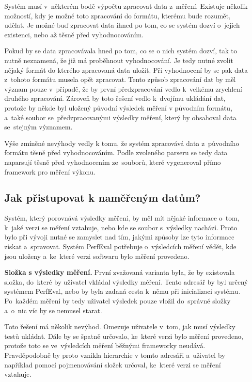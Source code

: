 Systém musí v~některém bodě výpočtu zpracovat data z~měření. Existuje několik možností, kdy
je možné toto zpracování do formátu, kterému bude rozumět, udělat. Je možné buď zpracovat
data ihned po tom, co se systém dozví o~jejich existenci, nebo až těsně před vyhodnocováním.

Pokud by se data zpracovávala hned po tom, co se o nich systém dozví, tak to nutně neznamená,
že již má proběhnout vyhodnocování. Je tedy nutné zvolit nějaký formát do kterého zpracovaná data
uložit. Při vyhodnocení by se pak data z~tohoto formátu musela opět zpracovat. Tento způsob
zpracování dat by měl význam pouze v~případě, že by první předzpracování vedlo k~velkému
zrychlení druhého zpracování. Zároveň by toto řešení vedlo k~dvojímu ukládání dat, protože
by někde byl uložený původní výsledek měření v původním formátu, a~také soubor se~předzpracovanými
výsledky měření, který by obsahoval data se~stejným významem.

Výše zmíněné nevýhody vedly k tomu, že systém zpracovává data z~původního formátu těsně před
vyhodnocováním. Podle zvoleného parseru se tedy data naparsují těsně před vyhodnocením ze~souborů,
které vygeneroval přímo framework pro měření výkonu.

\subsection{Jak přistupovat k naměřeným datům?}

Systém, který porovnává výsledky měření, by měl mít nějaké informace o~tom, k~jaké verzi se měření vztahuje, nebo kde
se soubor s~výsledky nachází. Proto bylo při vývoji nutné se zamyslet nad tím, jakými způsoby lze tyto informace získat a~spravovat.
Systém PerfEval potřebuje o~výsledcích měření vědět, kde jsou uloženy a~ke~které verzi softwaru bylo měření provedeno.

\noindent\textbf{Složka s výsledky měření.} První zvažovaná varianta byla, že by existovala složka, do~které by uživatel vkládal výsledky měření. Tento adresář by byl určený
systémem PerfEval, nebo by byla zadaná cesta k~němu při inicializaci systému. Po~každém měření by tedy uživatel výsledek pouze
vložil do~správné složky a~o~nic víc by se nemusel starat.

Toto řešení má několik nevýhod. Omezuje uživatele v~tom, jak musí výsledky testů ukládat. Dále by se špatně určovalo,
ke~které verzi bylo měření provedeno, protože toto se ve~výsledcích měření běžnými frameworky neudává. Pravděpodobně by proto
vznikla hierarchie v tomto adresáři a~uživatel by například pomocí pojmenovávání složek určoval, ke~které verzi se měření vztahuje.

